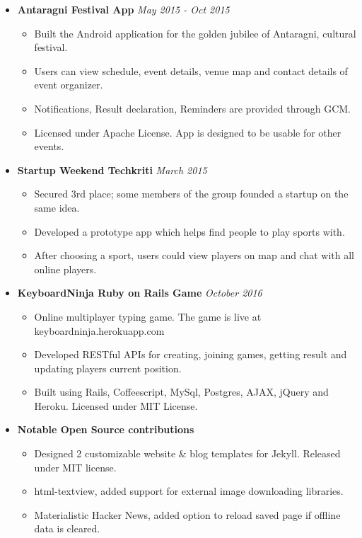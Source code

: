 \documentclass[a4paper]{article}
\begin{document}
\begin{itemize}
\begin{itemize}
	      \end{itemize}
	\item
	      \textbf{Antaragni Festival App}
	      \hfill \textit{May 2015 - Oct 2015}
	      \begin{itemize}
	      	\vspace{-2mm} \setlength\itemsep{-0.2em}
	      	\item Built the Android application for the golden jubilee of Antaragni, cultural festival.
	      	\item Users can view schedule, event details, venue map and contact details of event organizer.
	      	\item Notifications, Result declaration, Reminders are provided through GCM.
	      	\item Licensed under Apache License. App is designed to be usable for other events.
	      \end{itemize}
	\item
	      \textbf{Startup Weekend  Techkriti}
	      \hfill \textit{March 2015}
	      \begin{itemize}
	      	\vspace{-2mm} \setlength\itemsep{-0.2em}
	      	\item Secured 3rd place; some members of the group founded a startup on the same idea.
	      	\item Developed a prototype app which helps find people to play sports with.
	      	\item After choosing a sport, users could view players on map and chat with all online players.
	      \end{itemize}
	\item
	      \textbf{KeyboardNinja Ruby on Rails Game}
	      \hfill \textit{October 2016}
	      \begin{itemize}
		\vspace{-2mm} \setlength\itemsep{-0.2em}
		\item Online multiplayer typing game. The game is live at keyboardninja.herokuapp.com
		\item Developed RESTful APIs for creating, joining games, getting result and updating players current position.
		\item Built using Rails, Coffeescript, MySql, Postgres, AJAX, jQuery and Heroku. Licensed under MIT License.
	      \end{itemize}
	\item
	      \textbf{Notable Open Source contributions}
	      \begin{itemize}
	      	\vspace{-2mm} \setlength\itemsep{-0.2em}
	      	\item Designed 2 customizable website \& blog templates for Jekyll. Released under MIT license.
	      	\item html-textview, added support for external image downloading libraries.
	      	\item Materialistic Hacker News, added option to reload saved page if offline data is cleared.
	      \end{itemize}
\end{itemize}
\end{document}
